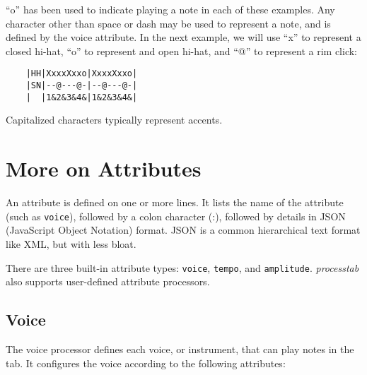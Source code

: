 \documentclass{article}
\begin{document}
``o'' has been used to indicate playing a note in each of these examples.
Any character other than space or dash may be used to represent a note, and is
defined by the voice attribute.  In the next example, we will use ``x'' to
represent a closed hi-hat, ``o'' to represent and open hi-hat, and ``@'' to
represent a rim click:

\begin{verbatim}
    |HH|XxxxXxxo|XxxxXxxo|
    |SN|--@---@-|--@---@-|
    |  |1&2&3&4&|1&2&3&4&|
\end{verbatim}

Capitalized characters typically represent accents.

\section*{More on Attributes}

An attribute is defined on one or more lines.  It lists the name of the
attribute (such as \verb!voice!), followed by a colon character (:), followed
by details in JSON (JavaScript Object Notation) format.  JSON is a common
hierarchical text format like XML, but with less bloat.

There are three built-in attribute types:  \verb!voice!, \verb!tempo!,
and \verb!amplitude!.  {\it processtab} also supports user-defined
attribute processors.

\subsection*{Voice}

The voice processor defines each voice, or instrument, that can play
notes in the tab.  It configures the voice according to the
following attributes:
\end{document}
